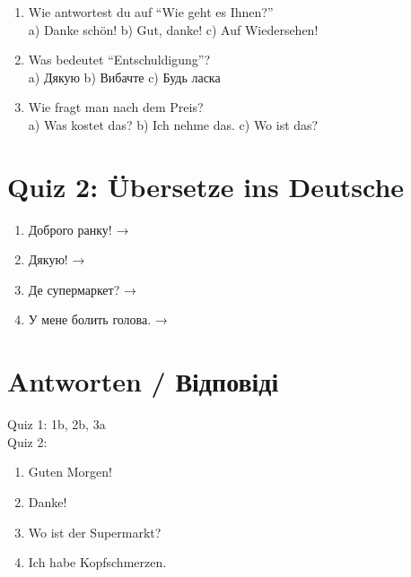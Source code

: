 \documentclass[12pt,twoside,openright]{memoir}
\begin{document}
\begin{uebungskasten}
\begin{enumerate}[nosep]
  \item Wie antwortest du auf ``Wie geht es Ihnen?''\\
    a) Danke schön! \quad b) Gut, danke! \quad c) Auf Wiedersehen!

  \item Was bedeutet ``Entschuldigung''?\\
    a) Дякую \quad b) Вибачте \quad c) Будь ласка

  \item Wie fragt man nach dem Preis?\\
    a) Was kostet das? \quad b) Ich nehme das. \quad c) Wo ist das?
\end{enumerate}
\end{uebungskasten}

\section{Quiz 2: Übersetze ins Deutsche}

\begin{uebungskasten}
\begin{enumerate}[nosep]
  \item Доброго ранку! → \underline{\hspace{5cm}}
  \item Дякую! → \underline{\hspace{5cm}}
  \item Де супермаркет? → \underline{\hspace{5cm}}
  \item У мене болить голова. → \underline{\hspace{5cm}}
\end{enumerate}
\end{uebungskasten}

\section{Antworten / Відповіді}

\begin{lernkasten}[Lösungen]
Quiz 1: 1b, 2b, 3a \\[0.3em]
Quiz 2:
\begin{enumerate}[nosep]
  \item Guten Morgen!
  \item Danke!
  \item Wo ist der Supermarkt?
  \item Ich habe Kopfschmerzen.
\end{enumerate}
\end{lernkasten}
\end{document}
